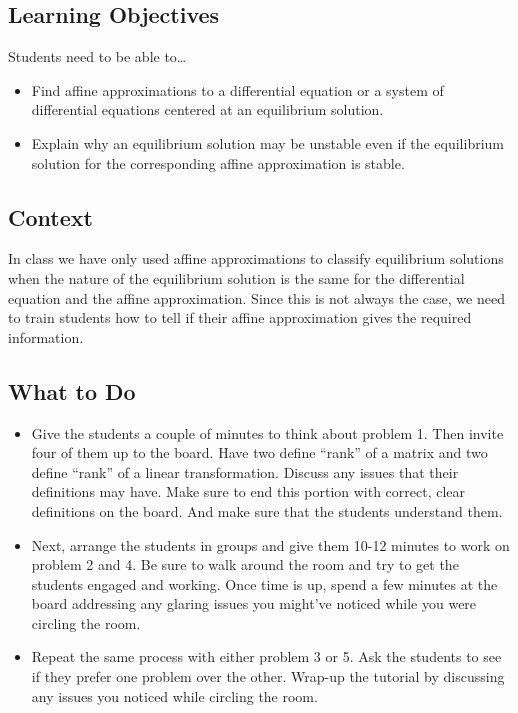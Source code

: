 \subsection*{Learning Objectives}
Students need to be able to\ldots
\begin{itemize}
	\item Find affine approximations to a differential equation or a system of differential equations centered
	      at an equilibrium solution.
	\item Explain why an equilibrium solution may be unstable even if the equilibrium solution
	      for the corresponding affine approximation is stable.
\end{itemize}

\subsection*{Context}

In class we have only used affine approximations to classify equilibrium solutions when the
nature of the equilibrium solution is the same for the differential equation and the affine approximation.
Since this is not always the case, we need to train students how to tell if their affine approximation
gives the required information.


\subsection*{What to Do}
\begin{itemize}
	\item Give the students a couple of minutes to think about
	      problem 1. Then invite four of them up to the board. Have
	      two define ``rank''
	      of a matrix and two define ``rank'' of a linear
	      transformation. Discuss any issues that their
	      definitions may have. Make sure to end this
	      portion with correct, clear definitions on
	      the board. And make sure that the students
	      understand them.

	\item Next, arrange the students in groups and give them
	      10-12 minutes to work on problem 2 and 4. Be sure to
	      walk around the room and try to get the students engaged
	      and working. Once time is up, spend a few minutes at
	      the board addressing any glaring issues you might've
	      noticed while you were circling the room.

	\item Repeat the same process with either problem 3 or
	      5. Ask the students to see if they prefer one problem
	      over the other. Wrap-up the tutorial by discussing any
	      issues you noticed while circling the room.
\end{itemize}

